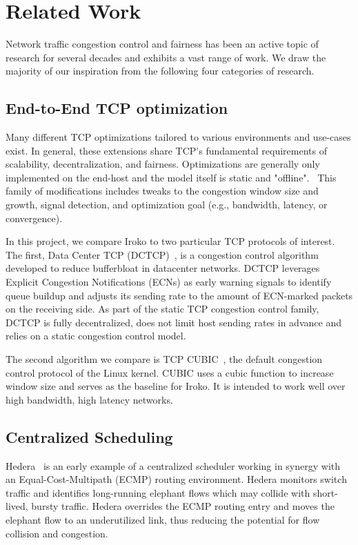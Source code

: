 \section{Related Work}
\label{sec:related}
Network traffic congestion control and fairness has been an active topic of 
research for several decades and exhibits a vast range of work. We draw the 
majority of our inspiration from the following four categories of research.

\subsection{End-to-End TCP optimization}
Many different TCP optimizations tailored to various environments and use-cases 
exist. In general, these extensions share TCP's fundamental requirements of 
scalability, decentralization, and fairness. Optimizations are generally only 
implemented on the end-host and the model itself is static and 
"offline".~\cite{throwdown} This family of modifications includes tweaks to the 
congestion window size and growth, signal detection, and optimization goal 
(e.g., bandwidth, latency, or convergence).~\cite{tcp_family}

In this project, we compare Iroko to two particular TCP protocols of interest.  
The first, Data Center TCP (DCTCP)~\cite{dctcp}, is a congestion control 
algorithm developed to reduce bufferbloat in datacenter networks. DCTCP 
leverages Explicit Congestion Notifications (ECNs) as early warning signals to 
identify queue buildup and adjusts its sending rate to the amount of ECN-marked 
packets on the receiving side. As part of the static TCP congestion control 
family, DCTCP is fully decentralized, does not limit host sending rates in 
advance and relies on a static congestion control model.

The second algorithm we compare is TCP CUBIC~\cite{cubic}, the default 
congestion control protocol of the Linux kernel. CUBIC uses a cubic function   
to increase window size and serves as the baseline for Iroko. It is intended to 
work well over high bandwidth, high latency networks.

\subsection{Centralized Scheduling}
Hedera~\cite{hedera} is an early example of a centralized scheduler working in 
synergy with an Equal-Cost-Multipath (ECMP) routing environment. Hedera 
monitors switch traffic and identifies long-running elephant flows which may 
collide with short-lived, bursty traffic. Hedera overrides the ECMP routing 
entry and moves the elephant flow to an underutilized link, thus reducing the 
potential for flow collision and congestion.


